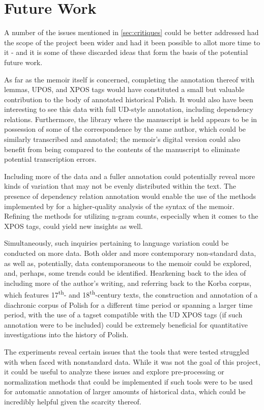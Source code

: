 \section{Future Work}
\label{sec:futurework}

A number of the issues mentioned in \autoref{sec:critiques} could be better addressed had the scope of the project been wider and had it been possible to allot more time to it - and it is some of these discarded ideas that form the basis of the potential future work. 

As far as the memoir itself is concerned, completing the annotation thereof with lemmas, UPOS, and XPOS tags would have constituted a small but valuable contribution to the body of annotated historical Polish. It would also have been interesting to see this data with full UD-style annotation, including dependency relations. Furthermore, the library where the manuscript is held appears to be in possession of some of the correspondence by the same author, which could be similarly transcribed and annotated; the memoir's digital version could also benefit from being compared to the contents of the manuscript to eliminate potential transcription errors.

Including more of the data and a fuller annotation could potentially reveal more kinds of variation that may not be evenly distributed within the text. The presence of dependency relation annotation would enable the use of the methods implemented by \citet{johannsen-etal-2015-cross} for a higher-quality analysis of the syntax of the memoir. Refining the methods for utilizing n-gram counts, especially when it comes to the XPOS tags, could yield new insights as well.

Simultaneously, such inquiries pertaining to language variation could be conducted on more data. Both older and more contemporary non-standard data, as well as, potentially, data contemporaneous to the memoir could be explored, and, perhaps, some trends could be identified. Hearkening back to the idea of including more of the author's writing, and referring back to the Korba corpus, which features 17\textsuperscript{th}- and 18\textsuperscript{th}-century texts, the construction and annotation of a diachronic corpus of Polish for a different time period or spanning a larger time period, with the use of a tagset compatible with the UD XPOS tags (if such annotation were to be included) could be extremely beneficial for quantitative investigations into the history of Polish.

The experiments reveal certain issues that the tools that were tested struggled with when faced with nonstandard data. While it was not the goal of this project, it could be useful to analyze these issues and explore pre-processing or normalization methods that could be implemented if such tools were to be used for automatic annotation of larger amounts of historical data, which could be incredibly helpful given the scarcity thereof. 

